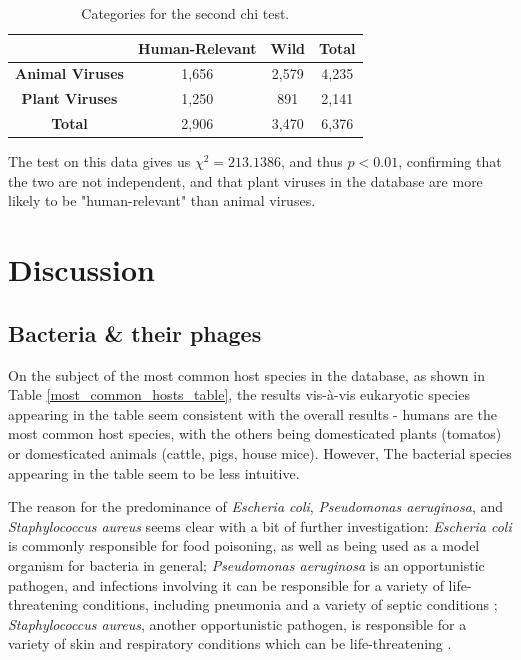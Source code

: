 \documentclass[12pt]{article}
\begin{document}
    \begin{table}[H]
        \begin{center}
            \begin{tabular}{|c|c|c|c|}
                \hline
                                        & \textbf{Human-Relevant} & \textbf{Wild} & \textbf{Total} \\ \hline
                \textbf{Animal Viruses} & 1,656                   & 2,579         & 4,235          \\ \hline
                \textbf{Plant Viruses}  & 1,250                   & 891           & 2,141          \\ \hline
                \textbf{Total}          & 2,906                   & 3,470         & 6,376          \\ \hline
            \end{tabular}
        \end{center}
        \caption{Categories for the second chi test.}
        \label{plants_animals_chi_test}
    \end{table}

    The test on this data gives us $\chi^2 = 213.1386$, and thus $p < 0.01$,
    confirming that the two are not independent, and that plant viruses in the
    database are more likely to be "human-relevant" than animal viruses.
        
    \section{Discussion}

    \subsection{Bacteria \& their phages}

    On the subject of the most common host species in the database, as shown in
    Table \ref{most_common_hosts_table}, the results vis-à-vis eukaryotic species
    appearing in the table seem consistent with the overall results - humans are
    the most common host species, with the others being domesticated plants
    (tomatos) or domesticated animals (cattle, pigs, house mice). However,
    The bacterial species appearing in the table seem to be less intuitive.

    The reason for the predominance of \emph{Escheria coli}, \emph{Pseudomonas
    aeruginosa}, and \emph{Staphylococcus aureus} seems clear with
    a bit of further investigation: \emph{Escheria coli} is commonly responsible
    for food poisoning, as well as being used as a model organism for bacteria
    in general; \emph{Pseudomonas aeruginosa} is an opportunistic pathogen, and
    infections involving it can be responsible for a variety of life-threatening
    conditions, including pneumonia and a variety of septic conditions \cite{pseudomonas};
    \emph{Staphylococcus aureus}, another opportunistic pathogen, is responsible
    for a variety of skin and respiratory conditions which can be life-threatening
    \cite{staph}.
\end{document}
